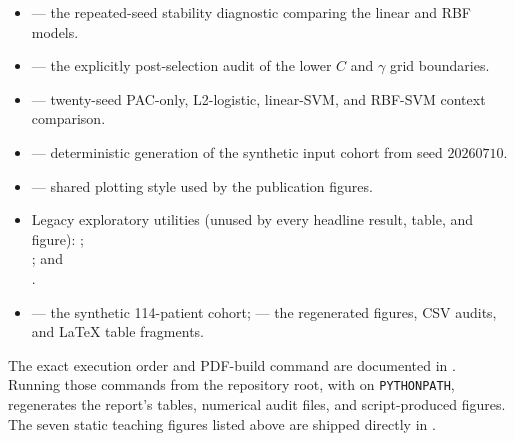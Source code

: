 \documentclass[11pt,a4paper]{article}
\numberwithin{equation}{section} %
\begin{document}
\begin{itemize}
    \item {} --- the repeated-seed
    stability diagnostic comparing the linear and RBF models.
    \item {} --- the explicitly
    post-selection audit of the lower $C$ and $\gamma$ grid boundaries.
    \item {} --- twenty-seed PAC-only,
    L2-logistic, linear-SVM, and RBF-SVM context comparison.
    \item {} --- deterministic
    generation of the synthetic input cohort from seed $20260710$.
    \item {} --- shared plotting style used by the
    publication figures.
    \item Legacy exploratory utilities (unused by every headline result, table,
    and figure): ;\\
    ; and\\
    .
    \item {} --- the synthetic 114-patient cohort;
     --- the regenerated figures, CSV audits, and \LaTeX{} table
    fragments.
\end{itemize}

The exact execution order and PDF-build command are documented in
. Running those commands from the repository root, with
 on \texttt{PYTHONPATH}, regenerates the report's tables,
numerical audit files, and script-produced figures. The seven static teaching
figures listed above are shipped directly in .
\end{document}
